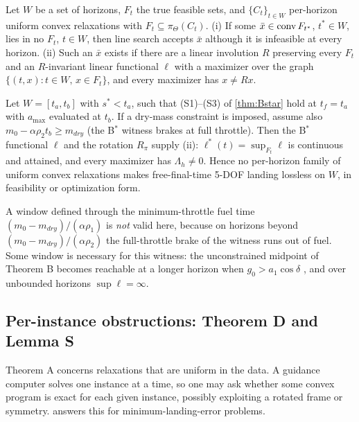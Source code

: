 \begin{lemma}\label{lem:LS}
Let $W$ be a set of horizons, $F_t$ the true feasible sets, and $\{C_t\}_{t\in W}$ per-horizon uniform convex
relaxations with $F_t\subseteq\pi_\Theta(C_t)$. (i) If some $\bar x\in\operatorname{conv} F_{t^*}$, $t^*\in W$, lies in no $F_t$,
$t\in W$, then line search accepts $\bar x$ although it is infeasible at every horizon. (ii) Such an $\bar x$ exists if
there are a linear involution $R$ preserving every $F_t$ and an $R$-invariant linear functional $\ell$ with a maximizer
over the graph $\{(t,x):t\in W,\,x\in F_t\}$, and every maximizer has $x\ne Rx$.
\end{lemma}
\begin{corollary}\label{cor:LS}
Let $W=[t_a,t_b]$ with $s^*<t_a$, such that (S1)--(S3) of \cref{thm:Bstar} hold at $t_f=t_a$ with $a_{\max}$ evaluated at $t_b$.
If a dry-mass constraint is imposed, assume also $m_0-\alpha\rho_2t_b\ge m_{dry}$ (the B$^*$ witness brakes at full throttle).
Then the B$^*$ functional $\ell$ and the rotation $R_\pi$ supply (ii): $\ell^*(t)=\sup_{F_t}\ell$ is continuous and attained,
and every maximizer has $\Lambda_h\neq0$. Hence no per-horizon family of uniform convex relaxations makes free-final-time
5-DOF landing lossless on $W$, in feasibility or optimization form.\Srep
\end{corollary}
A window defined through the minimum-throttle fuel time $(m_0-m_{dry})/(\alpha\rho_1)$ is \emph{not} valid here, because on
horizons beyond $(m_0-m_{dry})/(\alpha\rho_2)$ the full-throttle brake of the witness runs out of fuel. Some window is necessary for this witness: the unconstrained midpoint of Theorem B becomes reachable at a longer
horizon when $g_0>a_1\cos\delta$ , and over unbounded horizons $\sup\ell=\infty$.

\subsection{Per-instance obstructions: Theorem D and Lemma S}\label{sec:D}
Theorem A concerns relaxations that are uniform in the data. A guidance computer solves one instance at a time, so one
may ask whether some convex program is exact for each given instance, possibly exploiting a rotated frame or
symmetry.  answers this for minimum-landing-error problems.

